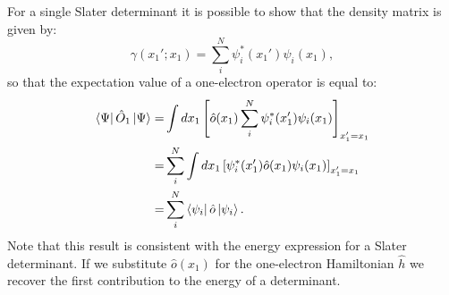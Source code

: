 \documentclass[../Main/chem532-notes.tex]{subfiles}
\begin{document}
For a single Slater determinant it is possible to show that the density matrix is given by:
\begin{equation}
\gamma(x_1';x_1) = \sum_i^N \psi_i^*(x_1') \psi_i(x_1),
\end{equation}
so that the expectation value of a one-electron operator is equal to:
\begin{equation}
\begin{split}
\bra{\Psi}\hat{O}_1 \ket{\Psi}
=&
\int dx_1 \left[ \hat{o}(x_1) \sum_i^N \psi_i^*(x_1') \psi_i(x_1) \right]_{x_1' = x_1} \\
=&  \sum_i^N \int dx_1 \left[\psi_i^*(x_1') \hat{o}(x_1) \psi_i(x_1) \right]_{x_1' = x_1} \\
=&  \sum_i^N \bra{\psi_i}\hat{o}\ket{\psi_i}.
\end{split}
\end{equation}
Note that this result is consistent with the energy expression for a Slater determinant. If we substitute $\hat{o}(x_1)$ for the one-electron Hamiltonian $\hat{h}$ we recover the first contribution to the energy of a determinant.
\end{document}
